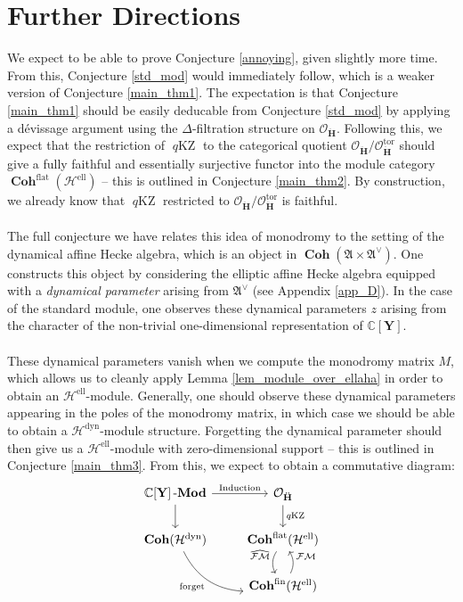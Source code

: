 \documentclass[a4paper]{report}
\theoremstyle{theorem}
\theoremstyle{definition}
\theoremstyle{remark}
\theoremstyle{proposition}
\theoremstyle{conjecture}
\theoremstyle{lemma}
\theoremstyle{corollary}
\theoremstyle{exercise}
\theoremstyle{example}
\newcommand{\C}{\mathbb{C}}
\newcommand{\mcal}{\mathcal}
\newcommand{\on}{\operatorname}
\newcommand{\coh}{\on{\mathbf{Coh}}}
\newcommand{\lmod}{\on{\mathbf{-Mod}}}
\newcommand{\qKZ}{\on{\mathit{q}KZ}}
\newcommand{\dyn}{{\on{dyn}}}
\begin{document}
  \chapter{Further Directions}
  
  We expect to be able to prove Conjecture \ref{annoying}, given slightly more time. From this, Conjecture \ref{std_mod}
  would immediately follow, which is a weaker version of Conjecture \ref{main_thm1}.
  The expectation is that Conjecture \ref{main_thm1} should be easily deducable from Conjecture \ref{std_mod} 
  by applying a d\'evissage argument 
  using the $\Delta$-filtration structure on $\mcal{O}_{\mathbf{\ddot{\mathbf{H}}}}$. Following this, we expect that the 
  restriction of $\qKZ$ to the categorical quotient $\mcal{O}_{\mathbf{\ddot{\mathbf{H}}}}/\mcal{O}_{\ddot{\mathbf{H}}}^{\on{tor}}$ 
  should give a fully faithful and essentially surjective functor into the module category 
  $\coh^{\on{flat}}(\mcal{H}^{\on{ell}})$ -- this is outlined in Conjecture \ref{main_thm2}. By construction, we already know that $\qKZ$ restricted to 
  $\mcal{O}_{\mathbf{\ddot{\mathbf{H}}}}/\mcal{O}_{\ddot{\mathbf{H}}}^{\on{tor}}$ is faithful.\\\\ 
  The full conjecture we have relates this idea of monodromy to the setting of the dynamical affine Hecke algebra, 
  which is an object in $\coh(\mathfrak{A} \times \mathfrak{A}^\vee)$. One constructs this object by considering the 
  elliptic affine Hecke algebra equipped with a \emph{dynamical parameter} arising from $\mathfrak{A}^\vee$ (see Appendix \ref{app_D}).
  In the case of the standard module, one observes these dynamical parameters $z$ arising from the character of the non-trivial 
  one-dimensional representation of $\C[\mathbf{Y}]$.\\\\
  These dynamical parameters vanish when we compute the monodromy matrix $M$, which allows us to cleanly 
  apply Lemma \ref{lem_module_over_ellaha} in order to obtain an $\mcal{H}^{\on{ell}}$-module. 
  Generally, one should observe these dynamical parameters appearing in the poles of the monodromy matrix, 
  in which case we should be able to obtain a $\mcal{H}^\dyn$-module structure. Forgetting the dynamical parameter 
  should then give us a $\mcal{H}^{\on{ell}}$-module with zero-dimensional support -- this is outlined in Conjecture \ref{main_thm3}. From this, we expect to obtain a 
  commutative diagram:
  $$\begin{tikzcd}
      {\C[\mathbf{Y}]\lmod} \arrow[r, "\on{Induction}"] \arrow[d] & \mcal{O}_{\mathbf{\ddot{\mathbf{H}}}} \arrow[d, "\qKZ"]                                      \\
      \coh(\mcal{H}^\dyn) \arrow[rd, "\on{forget}"', bend right]  & \coh^{\on{flat}}(\mcal{H}^{\on{ell}}) \arrow[d, "\widehat{\mcal{FM}}"', bend right] \\
                                                                  & \coh^{\on{fin}}(\mcal{H}^{\on{ell}}) \arrow[u, "\mcal{FM}"', bend right]           
  \end{tikzcd}$$
\end{document}
